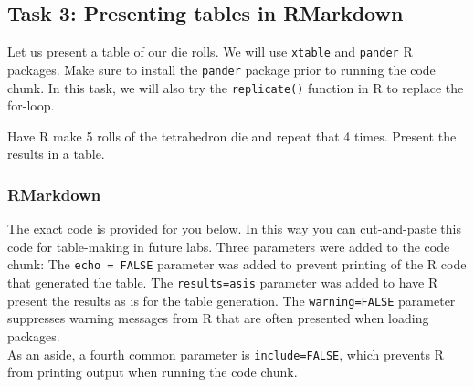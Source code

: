 \documentclass[
]{article}
\begin{document}
\hypertarget{task-3-presenting-tables-in-rmarkdown}{%
\subsection{Task 3: Presenting tables in
RMarkdown}\label{task-3-presenting-tables-in-rmarkdown}}

Let us present a table of our die rolls. We will use \texttt{xtable} and
\texttt{pander} R packages. Make sure to install the \texttt{pander}
package prior to running the code chunk. In this task, we will also try
the \texttt{replicate()} function in R to replace the for-loop.

Have R make 5 rolls of the tetrahedron die and repeat that 4 times.
Present the results in a table.

\hypertarget{rmarkdown}{%
\subsubsection{RMarkdown}\label{rmarkdown}}

The exact code is provided for you below. In this way you can
cut-and-paste this code for table-making in future labs. Three
parameters were added to the code chunk: The \texttt{echo\ =\ FALSE}
parameter was added to prevent printing of the R code that generated the
table. The \texttt{results=\textquotesingle{}asis\textquotesingle{}}
parameter was added to have R present the results as is for the table
generation. The \texttt{warning=FALSE} parameter suppresses warning
messages from R that are often presented when loading packages.\\
As an aside, a fourth common parameter is \texttt{include=FALSE}, which
prevents R from printing output when running the code chunk.
\end{document}
